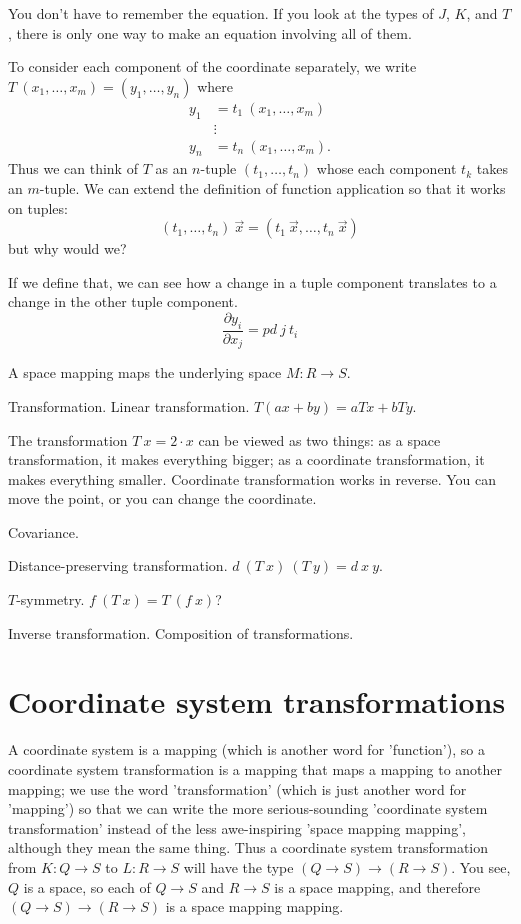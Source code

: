 You don't have to remember the equation.
If you look at the types of $J$, $K$, and $T$,
there is only one way to make an equation involving all of them.

To consider each component of the coordinate separately,
we write
$T~(x_1,\ldots,x_m) = (y_1,\ldots,y_n)$
where
\begin{align*}
y_1 &= t_1~(x_1,\ldots,x_m)
\\ &\vdots
\\ y_n &= t_n~(x_1,\ldots,x_m).
\end{align*}
Thus we can think of $T$ as an $n$-tuple $(t_1,\ldots,t_n)$
whose each component $t_k$ takes an $m$-tuple.
We can extend the definition of function application so that it works on tuples:
\[
(t_1,\ldots,t_n)~\vec{x} = (t_1~\vec{x}, \ldots, t_n~\vec{x})
\]
but why would we?

If we define that, we can see how a change in a tuple component translates
to a change in the other tuple component.
\[
\frac{\partial y_i}{\partial x_j} = pd~j~t_i
\]

A space mapping maps the underlying space $M : R \to S$.

Transformation.
Linear transformation.
$T(ax+by) = aTx + bTy$.

The transformation $T~x = 2\cdot x$ can be viewed as two things:
as a space transformation, it makes everything bigger;
as a coordinate transformation, it makes everything smaller.
Coordinate transformation works in reverse.
You can move the point, or you can change the coordinate.

Covariance.

Distance-preserving transformation.
$d~(T~x)~(T~y) = d~x~y$.

$T$-symmetry.
$f~(T~x) = T~(f~x)$?

Inverse transformation.
Composition of transformations.

\section{Coordinate system transformations}

A coordinate system is a mapping (which is another word for 'function'),
so a coordinate system transformation is a mapping that maps a mapping to another mapping;
we use the word 'transformation' (which is just another word for 'mapping') so that
we can write the more serious-sounding 'coordinate system transformation'
instead of the less awe-inspiring 'space mapping mapping',
although they mean the same thing.
Thus a coordinate system transformation
from $K : Q \to S$ to $L : R \to S$ will have the type
$(Q \to S) \to (R \to S)$.
You see, $Q$ is a space,
so each of $Q \to S$ and $R \to S$ is a space mapping,
and therefore $(Q \to S) \to (R \to S)$ is a space mapping mapping.

